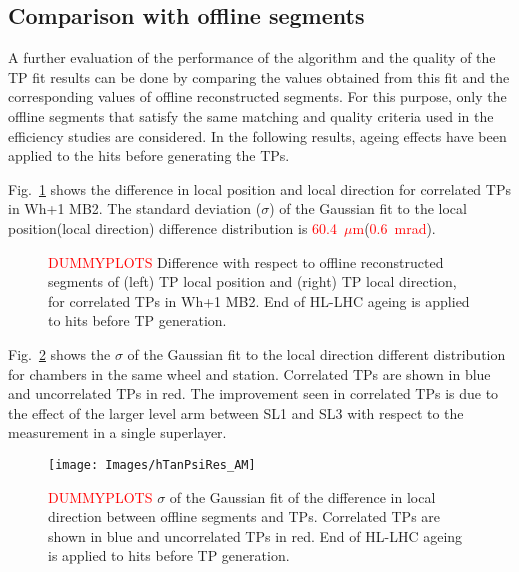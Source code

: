 \documentclass[../main.tex]{subfiles}
\begin{document}
\subsection{Comparison with offline segments}

A further evaluation of the performance of the algorithm and the quality of the TP fit results can be done by comparing the values obtained from this fit and the corresponding values of offline reconstructed segments. For this purpose, only the offline segments that satisfy the same matching and quality criteria used in the efficiency studies are considered. In the following results, ageing effects have been applied to the hits before generating the TPs.


Fig.~\ref{dts:fig:resol_fits} shows the difference in local position and local direction for correlated TPs in Wh+1 MB2. The standard deviation ($\sigma$) of the Gaussian fit to the local position(local direction) difference distribution is \textcolor{red}{60.4~$\mu$m}(\textcolor{red}{0.6~mrad}).


\begin{figure}[h!]
\begin{center}
\end{center}
\caption{\textcolor{red}{DUMMYPLOTS} Difference with respect to offline reconstructed segments of (left) TP local position and (right) TP local direction, for correlated TPs in Wh+1 MB2. End of HL-LHC ageing is applied to hits before TP generation.}
\label{dts:fig:resol_fits}
\end{figure}

Fig.~\ref{dts:fig:tanpsi_summary} shows the $\sigma$ of the Gaussian fit to the local direction different distribution for chambers in the same wheel and station. Correlated TPs are shown in blue and uncorrelated TPs in red. The improvement seen in correlated TPs is due to the effect of the larger level arm between SL1 and SL3 with respect to the measurement in a single superlayer.


\begin{figure}[h!]
\begin{center}
\texttt{[image: Images/hTanPsiRes\_AM]}
\end{center}
\caption{\textcolor{red}{DUMMYPLOTS} $\sigma$ of the Gaussian fit of the difference in local direction between offline segments and TPs. Correlated TPs are shown in blue and uncorrelated TPs in red. End of HL-LHC ageing is applied to hits before TP generation.}
\label{dts:fig:tanpsi_summary}
\end{figure}
\end{document}
